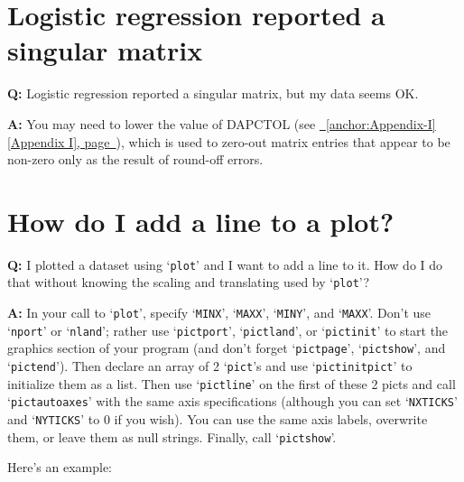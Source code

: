 \documentclass{book}
\renewcommand{\_}{\Texinfounderscore\discretionary{}{}{}}
\begin{document}
\section{{Logistic regression reported a singular matrix}}
\label{anchor:Logistic-regression-reported-a-singular-matrix}%

\textbf{Q:} Logistic regression reported a singular matrix, but my data seems OK.
%

\textbf{A:} You may need to lower the value of DAP\_CTOL (see \hyperref[anchor:Appendix-I]{\chaptername~\ref*{anchor:Appendix-I} [Appendix I], page~\pageref*{anchor:Appendix-I}}),
which is used to
zero-out matrix entries that appear to be non-zero only as the result of
round-off errors.


\section{{How do I add a line to a plot?}}
\label{anchor:How-do-I-add-a-line-to-a-plot_003f}%

\textbf{Q:} I plotted a dataset using `\texttt{plot}' and I want to add a line to it.
How do I do that without knowing the scaling and translating used by `\texttt{plot}'?

\textbf{A:} In your call to `\texttt{plot}', specify `\texttt{MINX}', `\texttt{MAXX}',
`\texttt{MINY}', and `\texttt{MAXX}'. Don't use `\texttt{nport}' or `\texttt{nland}'; rather use
`\texttt{pict\_port}', `\texttt{pict\_land}', or `\texttt{pict\_init}' to start the graphics section
of your program (and don't forget `\texttt{pict\_page}', `\texttt{pict\_show}',
and `\texttt{pict\_end}'). Then
declare an array of 2 `\texttt{pict}'s and use `\texttt{pict\_initpict}' to initialize them
as a list. Then use `\texttt{pict\_line}' on the first of these 2 picts and call
`\texttt{pict\_autoaxes}' with the same axis specifications (although you can
set `\texttt{NXTICKS}' and `\texttt{NYTICKS}' to 0 if you wish).
You can use the same axis labels, overwrite them, or leave them as null strings.
Finally, call `\texttt{pict\_show}'.

Here's an example:
\end{document}

